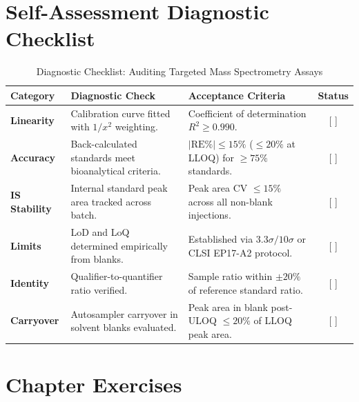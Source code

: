 \documentclass[11pt,twoside,openright]{book}
\begin{document}
\section{Self-Assessment Diagnostic Checklist}

\begin{table}[ht]
\centering
\caption{Diagnostic Checklist: Auditing Targeted Mass Spectrometry Assays}
\label{tab:targeted_checklist}
\small
\begin{tabularx}{\textwidth}{>{\raggedright\arraybackslash}l >{\raggedright\arraybackslash}p{5.2cm} >{\raggedright\arraybackslash}X c}
\toprule
\textbf{Category} & \textbf{Diagnostic Check} & \textbf{Acceptance Criteria} & \textbf{Status} \\
\midrule
\textbf{Linearity} & Calibration curve fitted with $1/x^2$ weighting. & Coefficient of determination $R^2 \ge 0.990$. & [ ] \\
\addlinespace
\textbf{Accuracy} & Back-calculated standards meet bioanalytical criteria. & $|\text{RE}\%| \le 15\%$ ($\le 20\%$ at LLOQ) for $\ge 75\%$ standards. & [ ] \\
\addlinespace
\textbf{IS Stability} & Internal standard peak area tracked across batch. & Peak area CV $\le 15\%$ across all non-blank injections. & [ ] \\
\addlinespace
\textbf{Limits} & LoD and LoQ determined empirically from blanks. & Established via $3.3 \sigma / 10 \sigma$ or CLSI EP17-A2 protocol. & [ ] \\
\addlinespace
\textbf{Identity} & Qualifier-to-quantifier ratio verified. & Sample ratio within $\pm 20\%$ of reference standard ratio. & [ ] \\
\addlinespace
\textbf{Carryover} & Autosampler carryover in solvent blanks evaluated. & Peak area in blank post-ULOQ $\le 20\%$ of LLOQ peak area. & [ ] \\
\bottomrule
\end{tabularx}
\end{table}

\FloatBarrier

\section{Chapter Exercises}
\end{document}
